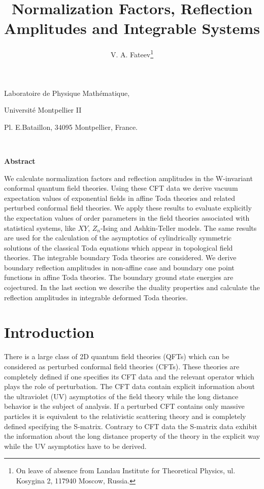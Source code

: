 \documentclass[a4paper,12pt]{article}
\begin{document}
\textwidth=15.8cm
\textheight=21cm
\author{V. A. Fateev\thanks{On leave of absence from Landau 
Institute for Theoretical Physics, ul.
Kosygina 2, 117940 Moscow, Russia.}}
\title{Normalization Factors, Reflection Amplitudes and Integrable Systems}
\date{}
\maketitle

\begin{center}
Laboratoire de Physique Math\'{e}matique,

Universit\'{e} Montpellier II

Pl. E.Bataillon, 34095 Montpellier, France.
\end{center}

\bigskip\ 

\begin{center}
{\bf Abstract}
\end{center}

We calculate normalization factors and reflection amplitudes in the
W-invariant conformal quantum field theories. Using these CFT data we derive
vacuum expectation values of exponential fields in affine Toda theories and
related perturbed conformal field theories. We apply these results to evaluate 
explicitly the expectation values of order parameters in the field theories 
associated with statistical systems, like $XY$, $Z_n$-Ising and Ashkin-Teller 
models. The same results are used for the calculation of the 
asymptotics of cylindrically symmetric solutions of the classical Toda
equations which appear in topological field theories. 
The integrable boundary Toda theories are considered. We derive
boundary reflection amplitudes in non-affine case and boundary one point
functions in affine Toda theories. The boundary ground state energies are 
cojectured. In the last section we describe the duality 
properties and calculate the reflection amplitudes in 
integrable deformed Toda theories.


\section{ Introduction}

There is a large class of 2D quantum field theories (QFTs) which can be
considered as perturbed conformal field theories (CFTs). These theories are
completely defined if one specifies its CFT data and the relevant operator
which plays the role of perturbation. The CFT data contain explicit
information about the ultraviolet (UV) asymptotics of the field theory while
the long distance behavior is the subject of analysis. If a perturbed CFT
contains only massive particles it is equivalent to the relativistic
scattering theory and is completely defined specifying the S-matrix.
Contrary to CFT data the S-matrix data exhibit the information about the
long distance property of the theory in the explicit way while the UV
asymptotics have to be derived.
\end{document}
